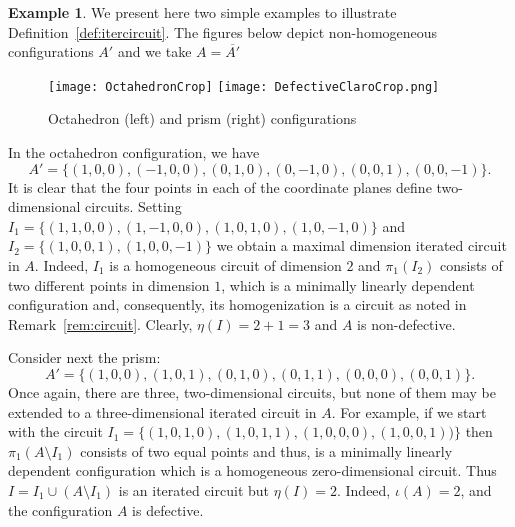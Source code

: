 \documentclass[11pt]{amsart}
\newcounter{examples}
\theoremstyle{plain}
\theoremstyle{definition}
\newtheorem{example}[theorem]{Example}
\theoremstyle{remark}
\newcommand{\beq}{\begin{equation}}
\newcommand{\eeq}{\end{equation}}
\numberwithin{equation}{section}
\begin{document}
  \begin{example}\label{ex:itcirc}
We present here two simple examples to illustrate Definition~\ref{def:itercircuit}. The figures below depict 
 non-homogeneous configurations $A'$ and we take $A = \overline{A'}$

\begin{figure}[h]
\label{fig:iter}
\texttt{[image: OctahedronCrop]} \qquad
\texttt{[image: DefectiveClaroCrop.png]}
\caption{Octahedron (left) and prism (right) configurations}
\end{figure}


In the octahedron configuration, we have 
\beq\label{octahedron}
A' = \{ (1,0,0),  (-1,0,0), (0,1,0), (0,-1,0), (0,0,1),(0,0,-1)\}.
\eeq 
It is clear that the four points in each of the coordinate planes define two-dimensional circuits. Setting 
 $I_1=\{ (1,1,0,0),  (1,-1,0,0), (1,0,1,0), (1,0,-1,0)\}$ and $I_2=\{ (1,0,0,1),(1,0,0,-1)\}$ 
 we obtain a maximal dimension iterated circuit in $A$.
Indeed, $I_1$ is a homogeneous circuit of dimension $2$ and $\pi_1(I_2)$ consists of two different points in dimension $1$,
 which is a minimally linearly dependent configuration and, consequently,  its homogenization is a circuit as noted in 
 Remark~\ref{rem:circuit}. Clearly, $\eta(I) = 2 + 1 =3$ and $A$ is non-defective.
 
Consider next the prism:
 \beq\label{prism} A' = \{(1,0,0), (1,0,1), (0,1,0), (0,1,1),  (0,0,0), (0,0,1)\}.
 \eeq
 Once again, there are three, two-dimensional circuits, but none of them may be extended to a 
 three-dimensional iterated circuit in $A$. For example, if we start with the circuit
$I_1 = \{ (1,0,1,0), (1,0,1,1),  (1,0,0,0), (1,0,0,1))\}$ then $\pi_1(A \setminus I_1)$ consists of two equal points and thus, is a minimally linearly 
dependent configuration which is a homogeneous zero-dimensional circuit.  
Thus $I = I_1 \cup (A \setminus I_1)$ is an iterated circuit but $\eta(I) = 2$.  Indeed, $\iota(A) =2$, and 
the configuration $A$ is defective. 
  
  \end{example}
  
\smallskip
\end{document}
